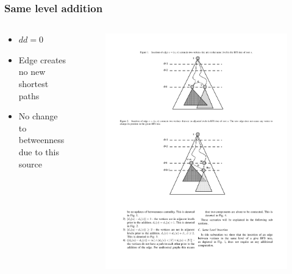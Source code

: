 \begin{frame}
  \frametitle{Same level addition}
  \begin{columns}[onlytextwidth]
  
    \begin{column}{0.5\textwidth}
      \begin{itemize}
        \item $dd = 0$
        \item Edge creates no new shortest paths
        \item No change to betweenness \\ due to this source
      \end{itemize}
    \end{column}
    
    \begin{column}{0.5\textwidth}
      \begin{figure}[t]
        \centering
        \includegraphics[width=\textwidth, height=\textheight, keepaspectratio]{imgs/green-0lvl-compressed}
      \end{figure}
    \end{column}
  \end{columns}
  
\end{frame}



